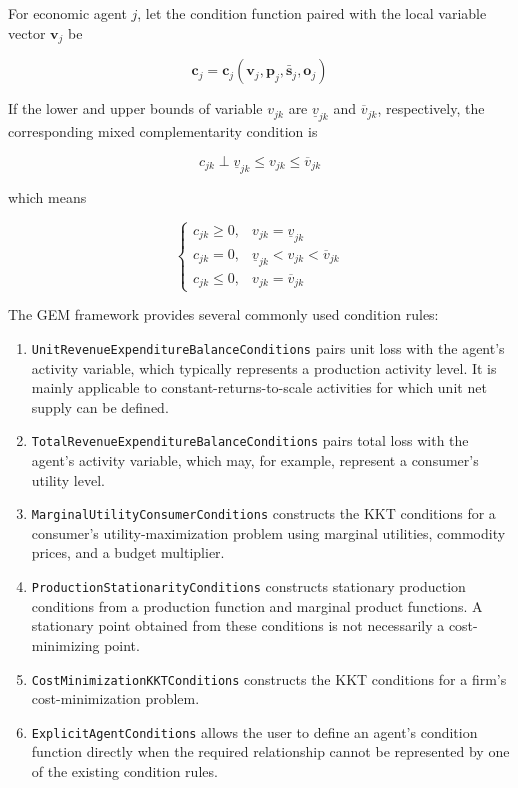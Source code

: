 \documentclass[
  letterpaper,
  DIV=11,
  numbers=noendperiod]{scrreprt}
\begin{document}
For economic agent \(j\), let the condition function paired with the
local variable vector \(\mathbf v_j\) be

\[
\mathbf c_j
=
\mathbf c_j(
\mathbf v_j,
\mathbf p_j,
\bar{\mathbf s}_j,
\mathbf o_j
)
\]

If the lower and upper bounds of variable \(v_{jk}\) are
\(\underline v_{jk}\) and \(\overline v_{jk}\), respectively, the
corresponding mixed complementarity condition is

\[
c_{jk}
\perp
\underline v_{jk}
\leq
v_{jk}
\leq
\overline v_{jk}
\]

which means

\[
\begin{cases}
c_{jk}\geq0,
&v_{jk}=\underline v_{jk}\\
c_{jk}=0,
&\underline v_{jk}<v_{jk}<\overline v_{jk}\\
c_{jk}\leq0,
&v_{jk}=\overline v_{jk}
\end{cases}
\]

The GEM framework provides several commonly used condition rules:

\begin{enumerate}
\def\labelenumi{\arabic{enumi}.}
\item
  \texttt{UnitRevenueExpenditureBalanceConditions} pairs unit loss with
  the agent's activity variable, which typically represents a production
  activity level. It is mainly applicable to constant-returns-to-scale
  activities for which unit net supply can be defined.
\item
  \texttt{TotalRevenueExpenditureBalanceConditions} pairs total loss
  with the agent's activity variable, which may, for example, represent
  a consumer's utility level.
\item
  \texttt{MarginalUtilityConsumerConditions} constructs the KKT
  conditions for a consumer's utility-maximization problem using
  marginal utilities, commodity prices, and a budget multiplier.
\item
  \texttt{ProductionStationarityConditions} constructs stationary
  production conditions from a production function and marginal product
  functions. A stationary point obtained from these conditions is not
  necessarily a cost-minimizing point.
\item
  \texttt{CostMinimizationKKTConditions} constructs the KKT conditions
  for a firm's cost-minimization problem.
\item
  \texttt{ExplicitAgentConditions} allows the user to define an agent's
  condition function directly when the required relationship cannot be
  represented by one of the existing condition rules.
\end{enumerate}
\end{document}

